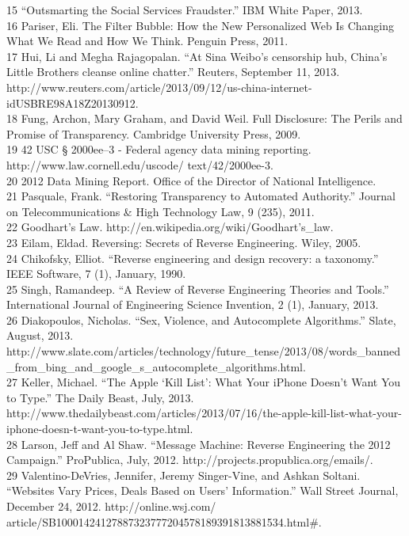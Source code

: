 15 ``Outsmarting the Social Services Fraudster.'' IBM White Paper, 2013. \\
16 Pariser, Eli. The Filter Bubble: How the New Personalized Web Is Changing What We Read and How We Think. Penguin Press, 2011. \\
17 Hui, Li and Megha Rajagopalan. ``At Sina Weibo's censorship hub, China's Little Brothers cleanse online chatter.'' Reuters, September 11, 2013. http://www.reuters.com/article/2013/09/12/us-china-internet-idUSBRE98A18Z20130912. \\
18 Fung, Archon, Mary Graham, and David Weil. Full Disclosure: The Perils and Promise of Transparency. Cambridge University Press, 2009. \\
19 42 USC § 2000ee–3 - Federal agency data mining reporting. http://www.law.cornell.edu/uscode/ text/42/2000ee-3. \\
20 2012 Data Mining Report. Office of the Director of National Intelligence. \\
21 Pasquale, Frank. ``Restoring Transparency to Automated Authority.'' Journal on Telecommunications & High Technology Law, 9 (235), 2011. \\
22 Goodhart's Law. http://en.wikipedia.org/wiki/Goodhart's_law. \\
23 Eilam, Eldad. Reversing: Secrets of Reverse Engineering. Wiley, 2005. \\
24 Chikofsky, Elliot. ``Reverse engineering and design recovery: a taxonomy.'' IEEE Software, 7 (1), January, 1990. \\
25 Singh, Ramandeep. ``A Review of Reverse Engineering Theories and Tools.'' International Journal of Engineering Science Invention, 2 (1), January, 2013. \\
26 Diakopoulos, Nicholas. ``Sex, Violence, and Autocomplete Algorithms.'' Slate, August, 2013. http://www.slate.com/articles/technology/future_tense/2013/08/words_banned_from_bing_and_google_s_autocomplete_algorithms.html.\\
27 Keller, Michael. ``The Apple ‘Kill List': What Your iPhone Doesn't Want You to Type.'' The Daily Beast, July, 2013. http://www.thedailybeast.com/articles/2013/07/16/the-apple-kill-list-what-your-iphone-doesn-t-want-you-to-type.html. \\
28 Larson, Jeff and Al Shaw. ``Message Machine: Reverse Engineering the 2012 Campaign.'' ProPublica, July, 2012. http://projects.propublica.org/emails/. \\
29 Valentino-DeVries, Jennifer, Jeremy Singer-Vine, and Ashkan Soltani. ``Websites Vary Prices, Deals Based on Users' Information.'' Wall Street Journal, December 24, 2012. http://online.wsj.com/ article/SB10001424127887323777204578189391813881534.html#. \\
